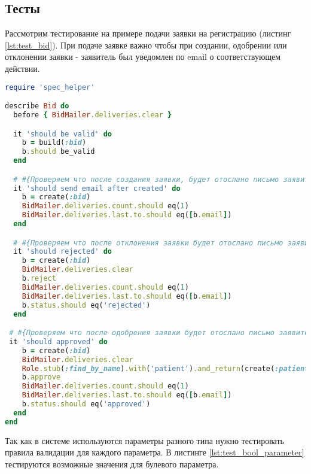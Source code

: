 \subsection{Тесты}
Рассмотрим тестирование на примере подачи заявки на регистрацию (листинг
\ref{lst:test_bid}).
При подаче заявке важно чтобы при создании, одобрении или отклонении заявки -
заявитель был уведомлен по email о соответствующем действии.

\begin{lstlisting}[language=Ruby,caption=Тестирование подачи заявки
,label={lst:test_bid}] 
require 'spec_helper'

describe Bid do
  before { BidMailer.deliveries.clear }

  it 'should be valid' do
    b = build(:bid)
    b.should be_valid
  end

  # #{Проверяем что после создания заявки, будет отослано письмо заявителю}
  it 'should send email after created' do
    b = create(:bid)
    BidMailer.deliveries.count.should eq(1)
    BidMailer.deliveries.last.to.should eq([b.email])
  end

  # #{Проверяем что после отклонения заявки будет отослано письмо заявителю}
  it 'should rejected' do
    b = create(:bid)
    BidMailer.deliveries.clear
    b.reject
    BidMailer.deliveries.count.should eq(1)
    BidMailer.deliveries.last.to.should eq([b.email])
    b.status.should eq('rejected')
  end

 # #{Проверяем что после одобрения заявки будет отослано письмо заявителю}
 it 'should approved' do
    b = create(:bid)
    BidMailer.deliveries.clear
    Role.stub(:find_by_name).with('patient').and_return(create(:patient_role))
    b.approve
    BidMailer.deliveries.count.should eq(1)
    BidMailer.deliveries.last.to.should eq([b.email])
    b.status.should eq('approved')
  end
end
\end{lstlisting}

Так как в системе используются параметры разного типа нужно тестировать правила
валидации для каждого параметра. В листинге \ref{lst:test_bool_parameter} тестируются
возможные значения для булевого параметра.

